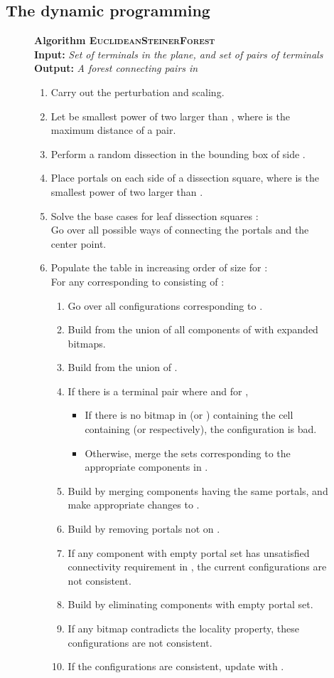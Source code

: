 \documentclass[extras,11pt]{article} \usepackage{fullpage}
\makeatletter
\theoremstyle{mytheorem}
\newcommand{\algo}[1]{\textsc{#1}}
\newcommand{\algtitle}[1]{\vspace{.1cm}\textbf{#1}}
\newcommand{\alginput}[1]{\\\textbf{Input:} \textit{#1}}
\newcommand{\algoutput}[1]{\\\textbf{Output:} \textit{#1}}
{\makeatletter
 \gdef\xxxmark{\expandafter\ifx\csname @mpargs\endcsname\relax \expandafter\ifx\csname @captype\endcsname\relax \marginpar{xxx}\else
       xxx \fi
   \else
     xxx \fi}
 \gdef\xxx{\@ifnextchar[\xxx@lab\xxx@nolab}
 \long\gdef\xxx@lab[#1]#2{{\bf [\xxxmark #2 ---{\sc #1}]}}
 \long\gdef\xxx@nolab#1{{\bf [\xxxmark #1]}}
}
\makeatother
\begin{document}
\subsection{The dynamic programming}


\begin{figure}
\begin{algorithm}
\algtitle{Algorithm \algo{EuclideanSteinerForest}}
\alginput{Set of terminals  in the plane, and set  of pairs of terminals}
\algoutput{A forest  connecting pairs in }
\begin{enumerate}\setlength{\itemsep}{-.00in}
\item Carry out the perturbation and scaling.
\item Let  be smallest power of two larger than , where  is the maximum distance of a pair.
\item Perform a random dissection in the bounding box of side .
\item Place  portals on each side of a dissection square, where  is the smallest power of two larger than  .
\item Solve the base cases  for leaf dissection squares :\\
Go over all possible ways of connecting the portals and the center point.
\item Populate the table  in increasing order of size for :\\
      For any  corresponding to  consisting of :
\begin{enumerate}\setlength{\itemsep}{-.02in}
 \item Go over all configurations  corresponding to .
 \item Build  from the union of all components of  with expanded bitmaps.
 \item Build  from the union of .
 \item If there is a terminal pair  where  and  for ,
\begin{itemize}\setlength{\itemsep}{-.02in}
 \item If there is no bitmap in  (or ) containing the cell containing  (or  respectively), the configuration is bad.
 \item Otherwise, merge the sets corresponding to the appropriate components in .
\end{itemize}
 \item Build  by merging components having the same portals,
  and make appropriate changes to .
 \item Build  by removing portals not on .
 \item If any component with empty portal set has unsatisfied connectivity requirement in , the current configurations are not consistent.
 \item Build  by eliminating components with empty portal set.
 \item If any bitmap contradicts the locality property, these configurations are not consistent.
 \item If the configurations are consistent, update  with .


\end{enumerate}
\end{enumerate}
\end{algorithm}
\end{figure}
\end{document}
